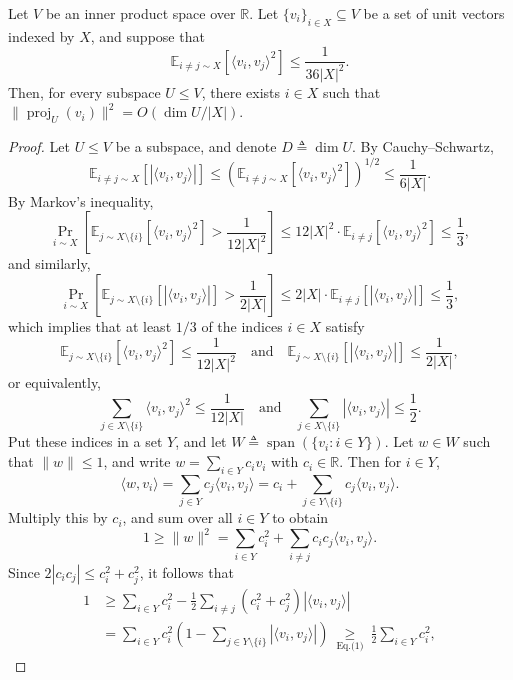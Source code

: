 \setcounter{nttheorem}{18}
\begin{ntlemma}
Let $V$ be an inner product space over $\mathbb R$. Let $\{v_i\}_{i\in X}\subseteq V$ be a set of unit vectors indexed by $X$, and suppose that
\[\mathbb E_{i\ne j\sim X}[\langle v_i,v_j\rangle^2]\leq\frac1{36|X|^2}.\]
Then, for every subspace $U\leq V$, there exists $i\in X$ such that $\|\operatorname{proj}_U(v_i)\|^2=O(\dim U/|X|)$.
\end{ntlemma}
\begin{proof}
Let $U\leq V$ be a subspace, and denote $D\triangleq\dim U$.
By Cauchy--Schwartz,
\[\mathbb E_{i\ne j\sim X}[|\langle v_i,v_j\rangle|]\leq\left(\mathbb E_{i\ne j\sim X}[\langle v_i,v_j\rangle^2]\right)^{1/2}\leq\frac1{6|X|}.\]
By Markov's inequality,
\[\Pr_{i\sim X}\left[\mathbb E_{j\sim X\setminus\{i\}}[\langle v_i,v_j\rangle^2]>\frac1{12|X|^2}\right]\leq12|X|^2\cdot\mathbb E_{i\ne j}[\langle v_i,v_j\rangle^2]\leq\frac13,\]
and similarly,
\[\Pr_{i\sim X}\left[\mathbb E_{j\sim X\setminus\{i\}}[|\langle v_i,v_j\rangle|]>\frac1{2|X|}\right]\leq2|X|\cdot\mathbb E_{i\ne j}[|\langle v_i,v_j\rangle|]\leq\frac13,\]
which implies that at least $1/3$ of the indices $i\in X$ satisfy
\[\mathbb E_{j\sim X\setminus\{i\}}[\langle v_i,v_j\rangle^2]\leq\frac1{12|X|^2}\quad\text{and}\quad\mathbb E_{j\sim X\setminus\{i\}}[|\langle v_i,v_j\rangle|]\leq\frac1{2|X|},\]
or equivalently,
\begin{equation}\sum_{j\in X\setminus\{i\}}\langle v_i,v_j\rangle^2\leq\frac1{12|X|}\quad\text{and}\quad\sum_{j\in X\setminus\{i\}}|\langle v_i,v_j\rangle|\leq\frac12.\tag{1}\end{equation}
Put these indices in a set $Y$, and let $W\triangleq\operatorname{span}(\{v_i:i\in Y\})$.
Let $w\in W$ such that $\|w\|\leq1$, and write $w=\sum_{i\in Y}c_iv_i$ with $c_i\in\mathbb R$. Then for $i\in Y$,
\[\langle w,v_i\rangle=\sum_{j\in Y}c_j\langle v_i,v_j\rangle=c_i+\sum_{j\in Y\setminus\{i\}}c_j\langle v_i,v_j\rangle.\]
Multiply this by $c_i$, and sum over all $i\in Y$ to obtain
\[1\geq\|w\|^2=\sum_{i\in Y}c_i^2+\sum_{i\ne j}c_ic_j\langle v_i,v_j\rangle.\]
Since $2|c_ic_j|\leq c_i^2+c_j^2$, it follows that
\begin{align*}1&\geq\sum_{i\in Y}c_i^2-\frac12\sum_{i\ne j}(c_i^2+c_j^2)|\langle v_i,v_j\rangle|\\&=\sum_{i\in Y}c_i^2\left(1-\sum_{j\in Y\setminus\{i\}}|\langle v_i,v_j\rangle|\right)\ \underset{\text{Eq.(1)}}\geq\ \frac12\sum_{i\in Y}c_i^2,\end{align*}

\end{proof}
